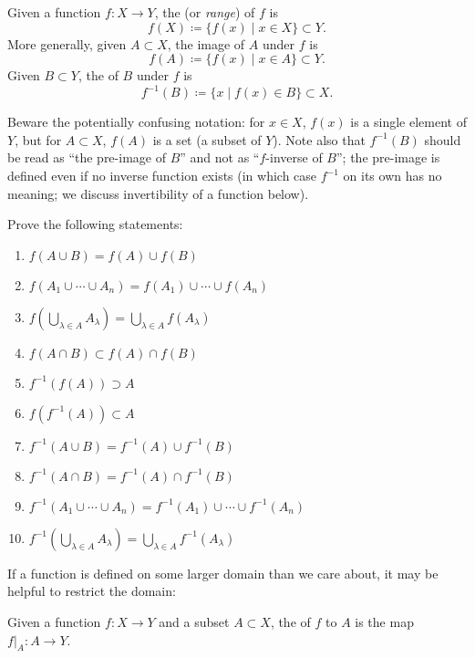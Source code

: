 \begin{definition}
Given a function $f:X \to Y$, the  (or \emph{range}) of $f$ is
\[f(X)\coloneqq\{f(x)\mid x\in X\}\subset Y.\]
More generally, given $A \subset X$, the image of $A$ under $f$ is
\[f(A)\coloneqq\{f(x)\mid x\in A\}\subset Y.\]
Given $B \subset Y$, the  of $B$ under $f$ is
\[f^{-1}(B)\coloneqq\{x\mid f(x)\in B\}\subset X.\]
\end{definition}

\begin{remark}
Beware the potentially confusing notation: for $x \in X$, $f(x)$ is a single element of $Y$, but for $A \subset X$, $f(A)$ is a set (a subset of $Y$). Note also that $f^{-1}(B)$ should be read as ``the pre-image of $B$'' and not as ``$f$-inverse of $B$''; the pre-image is defined even if no inverse function exists (in which case $f^{-1}$ on its own has no meaning; we discuss invertibility of a function below).
\end{remark}

\begin{exercise}
Prove the following statements:
\begin{enumerate}[label=(\roman*)]
\item $f(A\cup B)=f(A)\cup f(B)$
\item $f(A_1\cup\cdots\cup A_n)=f(A_1)\cup\cdots\cup f(A_n)$
\item $f(\bigcup_{\lambda\in A}A_\lambda)=\bigcup_{\lambda\in A}f(A_\lambda)$
\item $f(A\cap B)\subset f(A)\cap f(B)$
\item $f^{-1}(f(A))\supset A$
\item $f(f^{-1}(A))\subset A$
\item $f^{-1}(A\cup B)=f^{-1}(A)\cup f^{-1}(B)$
\item $f^{-1}(A\cap B)=f^{-1}(A)\cap f^{-1}(B)$
\item $f^{-1}(A_1\cup\cdots\cup A_n)=f^{-1}(A_1)\cup\cdots\cup f^{-1}(A_n)$
\item $f^{-1}(\bigcup_{\lambda\in A}A_\lambda)=\bigcup_{\lambda\in A}f^{-1}(A_\lambda)$
\end{enumerate}
\end{exercise}

If a function is defined on some larger domain than we care about, it may be helpful to restrict the domain:

\begin{definition}[Restriction]
Given a function $f:X \to Y$ and a subset $A \subset X$, the  of $f$ to $A$ is the map $f|_A:A \to Y$.
\end{definition}

